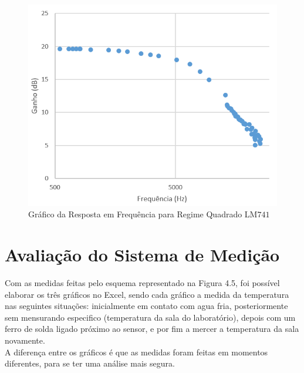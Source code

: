 \documentclass[14pt, oneside]{book}
\newcommand\tab[1][1cm]{\hspace*{#1}}
\theoremstyle{definition}
\begin{document}
                \begin{figure}[H]
                        \centering
                        \includegraphics[scale = 1]{amplificacao_quadrada(db)2.PNG}
                        \caption{Gráfico da Resposta em Frequência para Regime Quadrado LM$741$}
                        \label{quadrada}
                    \end{figure}

            \section{Avaliação do Sistema de Medição}
			    \tab Com as medidas feitas pelo esquema representado na Figura 4.5, foi possível elaborar os três gráficos no Excel, sendo cada gráfico a medida da temperatura nas seguintes situações: inicialmente em contato com agua fria, posteriormente sem mensurando especifico (temperatura da sala do laboratório), depois com um ferro de solda ligado próximo ao sensor, e por fim a mercer a temperatura da sala novamente. \\
			    \tab A diferença entre os gráficos é que as medidas foram feitas em momentos diferentes, para se ter uma análise mais segura.
			    
\end{document}
